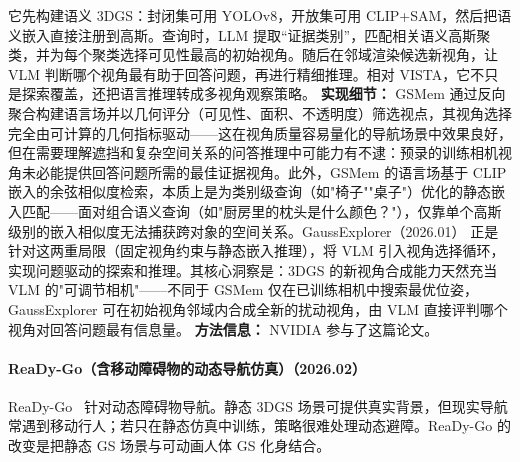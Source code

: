它先构建语义 3DGS：封闭集可用 YOLOv8，开放集可用 CLIP+SAM，然后把语义嵌入直接注册到高斯。查询时，LLM 提取“证据类别”，匹配相关语义高斯聚类，并为每个聚类选择可见性最高的初始视角。随后在邻域渲染候选新视角，让 VLM 判断哪个视角最有助于回答问题，再进行精细推理。相对 VISTA，它不只是探索覆盖，还把语言推理转成多视角观察策略。
\textbf{实现细节：} GSMem 通过反向聚合构建语言场并以几何评分（可见性、面积、不透明度）筛选视点，其视角选择完全由可计算的几何指标驱动——这在视角质量容易量化的导航场景中效果良好，但在需要理解遮挡和复杂空间关系的问答推理中可能力有不逮：预录的训练相机视角未必能提供回答问题所需的最佳证据视角。此外，GSMem 的语言场基于 CLIP 嵌入的余弦相似度检索，本质上是为类别级查询（如"椅子""桌子"）优化的静态嵌入匹配——面对组合语义查询（如"厨房里的枕头是什么颜色？"），仅靠单个高斯级别的嵌入相似度无法捕获跨对象的空间关系。GaussExplorer（2026.01） 正是针对这两重局限（固定视角约束与静态嵌入推理），将 VLM 引入视角选择循环，实现问题驱动的探索和推理。其核心洞察是：3DGS 的新视角合成能力天然充当 VLM 的"可调节相机"——不同于 GSMem 仅在已训练相机中搜索最优位姿，GaussExplorer 可在初始视角邻域内合成全新的扰动视角，由 VLM 直接评判哪个视角对回答问题最有信息量。
\textbf{方法信息：} NVIDIA 参与了这篇论文。



\paragraph{ReaDy-Go（含移动障碍物的动态导航仿真）（2026.02）}
ReaDy-Go~\cite{2602_11575} 针对动态障碍物导航。静态 3DGS 场景可提供真实背景，但现实导航常遇到移动行人；若只在静态仿真中训练，策略很难处理动态避障。ReaDy-Go 的改变是把静态 GS 场景与可动画人体 GS 化身结合。

